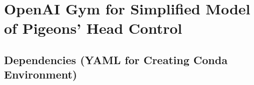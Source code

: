 \section{OpenAI Gym for Simplified Model of Pigeons' Head Control}


\subsection{Dependencies (YAML for Creating Conda Environment)}

